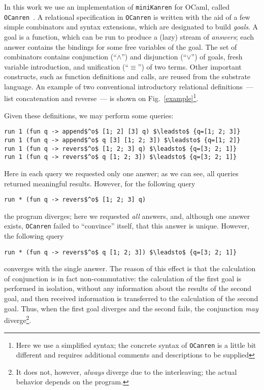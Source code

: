 \documentclass[preprint,numbers,10pt]{sigplanconf}
\newcommand{\miniKanren}{\texttt{miniKanren}\xspace}
\newcommand{\ocanren}{\texttt{OCanren}\xspace}
\begin{document}
In this work we use an implementation of \miniKanren for OCaml, called \ocanren~\cite{Ocanren}. A relational specification in \ocanren is written with the aid of
a few simple combinators and syntax extensions, which are designated to build \emph{goals}. A goal is a function, which can be run to produce a (lazy) stream of
\emph{answers}; each answer contains the bindings for some free variables of the goal. The set of combinators contains conjunction (``$\wedge$'') and disjunction
(``$\vee$'') of goals, fresh variable introduction, and unification (``$\equiv$'') of two terms. Other important constructs, such as function definitions and calls, are 
reused from the substrate language. An example of two conventional introductory relational definitions~--- list concatenation and reverse~--- is shown on 
Fig.~\ref{example}\footnote{Here we use a simplified syntax; the concrete syntax of \ocanren is a little bit different and requires additional comments and 
descriptions to be supplied}.

Given these definitions, we may perform some queries:

\begin{lstlisting}
run 1 (fun q -> append$^o$ [1; 2] [3] q) $\leadsto$ {q=[1; 2; 3]}
run 1 (fun q -> append$^o$ q [3] [1; 2; 3]) $\leadsto$ {q=[1; 2]}
run 1 (fun q -> revers$^o$ [1; 2; 3] q) $\leadsto$ {q=[3; 2; 1]}
run 1 (fun q -> revers$^o$ q [1; 2; 3]) $\leadsto$ {q=[3; 2; 1]}
\end{lstlisting}

Here in each query we requested only one answer; as we can see, all queries returned meaningful results. However, for the following query

\begin{lstlisting}
run * (fun q -> revers$^o$ [1; 2; 3] q)
\end{lstlisting}

\noindent the program diverges; here we requested \emph{all} answers, and, although one answer exists, \ocanren failed to ``convince'' itself, 
that this answer is unique. However, the following query

\begin{lstlisting}
run * (fun q -> revers$^o$ q [1; 2; 3]) $\leadsto$ {q=[3; 2; 1]}
\end{lstlisting}

\noindent converges with the single answer. The reason of this effect is that the calculation of conjunction is in fact non-commutative: the calculation 
of the first goal is performed in isolation, without any information about the results of the second goal, and then received information is transferred to the 
calculation of the second goal. Thus, when the first goal diverges and the second fails, the conjunction \emph{may} diverge\footnote{It does not, however, 
\emph{always} diverge due to the interleaving; the actual behavior depends on the program.}. 
\end{document}
